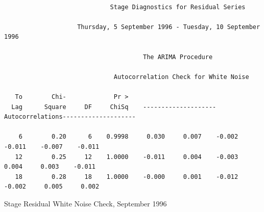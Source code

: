 \documentclass[12pt]{report}
\begin{document}
\begin{table} \scriptsize
\begin{centering}
\begin{verbatim}

                             Stage Diagnostics for Residual Series

                    Thursday, 5 September 1996 - Tuesday, 10 September 1996

                                      The ARIMA Procedure

                              Autocorrelation Check for White Noise

   To        Chi-             Pr >
  Lag      Square     DF     ChiSq    --------------------Autocorrelations--------------------

    6        0.20      6    0.9998     0.030     0.007    -0.002    -0.011    -0.007    -0.011
   12        0.25     12    1.0000    -0.011     0.004    -0.003     0.004     0.003    -0.011
   18        0.28     18    1.0000    -0.000     0.001    -0.012    -0.002     0.005     0.002

\end{verbatim}
\end{centering}\normalsize\caption{Stage Residual White Noise Check, September 1996}\label{fig:sepstagewht}
\end{table}
\end{document}
